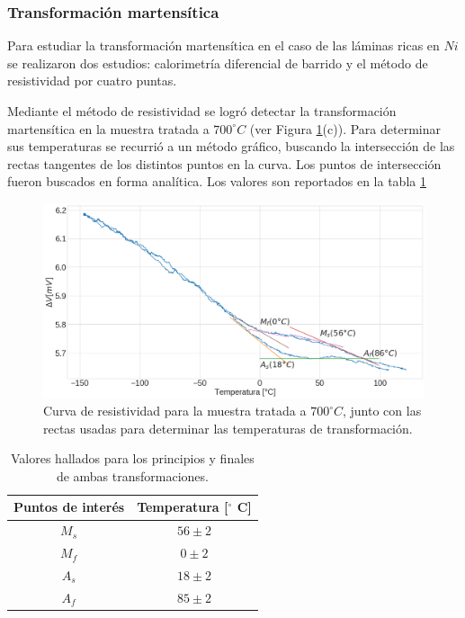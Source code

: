 \documentclass[12pt]{article}
\theoremstyle{definition}
\theoremstyle{remark}
\begin{document}
{\subsubsection{Transformación martensítica}
Para estudiar la transformación martensítica en el caso de las láminas ricas en $Ni$ se realizaron dos estudios: calorimetría diferencial de barrido y el método de resistividad por cuatro puntas.

Mediante el método de resistividad se logró detectar la transformación martensítica en la muestra tratada a $700 ^\circ C$ (ver Figura \ref{Res700}(c)). Para determinar sus temperaturas se recurrió a un método gráfico, buscando la intersección de las rectas tangentes de los distintos puntos en la curva. Los puntos de intersección fueron buscados en forma analítica. Los valores son reportados en la tabla \ref{TransformationPoints}

\begin{figure}[H]
 	\centering
	\includegraphics[scale=0.3]{img/Resistance_700.png}
 	\caption{Curva de resistividad para la muestra tratada a $700 ^\circ C$, junto con las rectas usadas para determinar las temperaturas de transformación.}
	\label{Res700}
\end{figure}



\begin{table}[h]
\centering
\begin{tabular}{|c|c|}
\hline
Puntos de interés & Temperatura {[}$^\circ$ C{]} \\ \hline
$M_s$             & $56 \pm 2$                   \\ \hline
$M_f$             & $0 \pm 2$                    \\ \hline
$A_s$             & $18 \pm 2$                   \\ \hline
$A_f$             & $85 \pm 2$                   \\ \hline
\end{tabular}
\caption{Valores hallados para los principios y finales de ambas transformaciones.}
\label{TransformationPoints}
\end{table}

}
\end{document}
